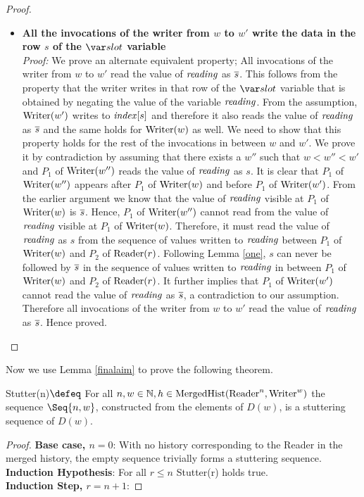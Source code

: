 \begin{description}
\begin{proof}
\begin{itemize}
\item \textbf{All the invocations of the writer from $w$ to $w'$ write the data in the row $s$ of the $\slot$ variable}\\
\emph{Proof:} We prove an alternate equivalent property; All invocations of the writer from $w$ to $w'$ read the value of $\mathit{reading}$ as $\overline{s}$. This follows from the property that the 
writer writes in that row of the $\slot$ variable that is obtained by negating the value of the variable $\mathit{reading}$. From the assumption, $\mathrm{Writer}(w')$ writes to $\mathit{index}[s]$ and therefore it also reads the value of $\mathit{reading}$ as $\overline{s}$ and the same holds for $\mathrm{Writer}(w)$ as well. We need to show that this property holds for the rest of the invocations in between $w$ and $w'$. We prove it by contradiction by assuming that there exists a $w''$ such that $w<w''<w'$ and $P_1$ of $\mathrm{Writer}(w'')$ reads the value of $\mathit{reading}$ as $s$. It is clear that $P_1$ of $\mathrm{Writer}(w'')$ appears after $P_1$ of $\mathrm{Writer}(w)$ and before $P_1$ of $\mathrm{Writer}(w')$. From the earlier argument we know that the value of $\mathit{reading}$ visible at $P_1$ of $\mathrm{Writer}(w)$ is $\overline{s}$. Hence, $P_1$ of $\mathrm{Writer}(w'')$ cannot read from the value of $\mathit{reading}$ visible at $P_1$ of $\mathrm{Writer}(w)$. Therefore, it must read the value of $\mathit{reading}$ as $s$ from the sequence of values written to $\mathit{reading}$ between $P_1$ of $\mathrm{Writer}(w)$ and $P_2$ of $\mathrm{Reader}(r)$. 
Following Lemma \ref{one}, $s$ can never be followed by $\overline{s}$ in the sequence of values written to $\mathit{reading}$ in between $P_1$ of $\mathrm{Writer}(w)$ and $P_2$ of $\mathrm{Reader}(r)$. 
It further implies that $P_1$ of $\mathrm{Writer}(w')$ cannot read the value of $\mathit{reading}$ as $\overline{s}$, a contradiction to our assumption. Therefore all invocations of the writer from $w$ to $w'$ read the value of $\mathit{reading}$ as $\overline{s}$. Hence proved.
\end{itemize}

\end{proof}
   
Now we use Lemma \ref{finalaim} to prove the following theorem.
\begin{theorem}
Stutter(n)$\defeq$ For all $n,w \in \mathbb{N},h\in \mathrm{MergedHist}(\mathrm{Reader}^n,\mathrm{Writer}^w)$ the sequence
$\Seq{n,w}$, constructed from the elements of $D(w)$, is a stuttering sequence of $D(w)$.
\end{theorem}
\begin{proof}
 \textbf{Base case, $n=0$}: With no history corresponding to the Reader in the merged history, the empty sequence trivially forms a stuttering sequence.\\
 \textbf{Induction Hypothesis}: For all $r \le n$ Stutter(r) holds true.\\
 \textbf{Induction Step, $r=n+1$}: 



\end{proof}
\end{description}
